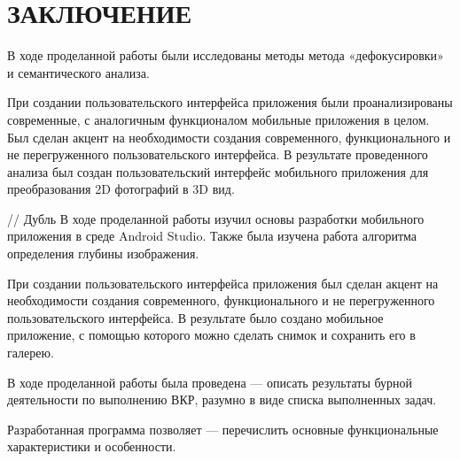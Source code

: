 \documentclass[a4paper,12pt]{article}
\begin{document}
%
\pagebreak
\pagebreak
\pagebreak




\section*{\centering ЗАКЛЮЧЕНИЕ}

В ходе проделанной работы были исследованы методы  метода «дефокусировки» и семантического анализа.

При создании пользовательского интерфейса приложения были проанализированы современные, с аналогичным функционалом мобильные приложения в целом. Был сделан акцент на необходимости создания современного, функционального и не перегруженного пользовательского интерфейса. В результате проведенного анализа был создан пользовательский интерфейс мобильного приложения для преобразования 2D фотографий в 3D вид.


// Дубль
В ходе проделанной работы изучил основы разработки мобильного приложения в среде Android Studio. Также была изучена работа алгоритма определения глубины изображения.

При создании пользовательского интерфейса приложения был сделан акцент на необходимости создания современного, функционального и не перегруженного пользовательского интерфейса. В результате  было создано мобильное приложение, с помощью которого можно сделать снимок и сохранить его в галерею.


В ходе проделанной работы была проведена --- описать результаты бурной деятельности по выполнению ВКР, разумно в виде списка выполненных задач.

Разработанная программа позволяет --- перечислить основные функциональные характеристики и особенности.

\pagebreak

\printbibliography
\end{document}
